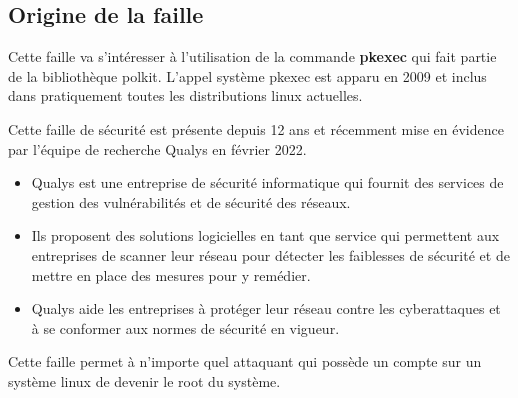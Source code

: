 \documentclass[12pt,a4paper]{article}
\begin{document}
		\subsection{Origine de la faille}   
   		\begin{flushleft}
   			\noindent Cette faille va s'intéresser à l'utilisation de la commande \textbf{pkexec} qui fait partie de la bibliothèque polkit. L'appel système pkexec est apparu en 2009 et inclus dans pratiquement toutes les distributions linux actuelles.
   			\item Cette faille de sécurité est présente depuis 12 ans et récemment mise en évidence par l'équipe de recherche Qualys en février 2022. \cite{qualys}
                \begin{itemize}
                    \item Qualys est une entreprise de sécurité informatique qui fournit des services de gestion des vulnérabilités et de sécurité des réseaux. 
                    \item Ils proposent des solutions logicielles en tant que service qui permettent aux entreprises de scanner leur réseau pour détecter les faiblesses de sécurité et de mettre en place des mesures pour y remédier. 
                    \item Qualys aide les entreprises à protéger leur réseau contre les cyberattaques et à se conformer aux normes de sécurité en vigueur.
                \end{itemize}
   			\item Cette faille permet à n’importe quel attaquant qui possède un compte sur un système linux de devenir le root du système.

\end{flushleft}
\end{document}
